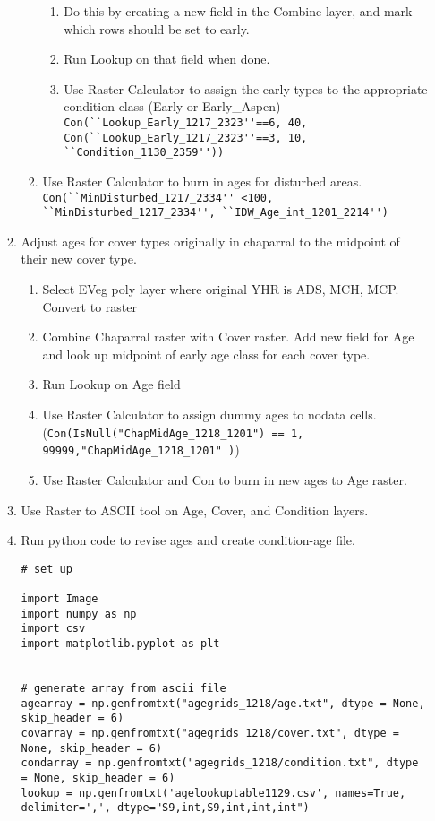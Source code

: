 \begin{enumerate}
\begin{enumerate}
\begin{enumerate}
\begin{enumerate}
                \item Do this by creating a new field in the Combine layer, and mark which rows should be set to early.
                \item Run Lookup on that field when done.
                \item Use Raster Calculator to assign the early types to the appropriate condition class (Early or Early\_Aspen) \lstinline{Con(``Lookup_Early_1217_2323''==6, 40, Con(``Lookup_Early_1217_2323''==3, 10, ``Condition_1130_2359''))}
                \end{enumerate}
            \item Use Raster Calculator to burn in ages for disturbed areas. \lstinline{Con(``MinDisturbed_1217_2334'' <100, ``MinDisturbed_1217_2334'', ``IDW_Age_int_1201_2214'')}
        \end{enumerate}
        \item Adjust ages for cover types originally in chaparral to the midpoint of their new cover type.
        \begin{enumerate}
            \item Select EVeg poly layer where original YHR is ADS, MCH, MCP. Convert to raster
            \item Combine Chaparral raster with Cover raster. Add new field for Age and look up midpoint of early age class for each cover type.
            \item Run Lookup on Age field
            \item Use Raster Calculator to assign dummy ages to nodata cells. (\lstinline{Con(IsNull("ChapMidAge_1218_1201") == 1, 99999,"ChapMidAge_1218_1201" )})
            \item Use Raster Calculator and Con to burn in new ages to Age raster.
        \end{enumerate}
        \item Use Raster to ASCII tool on Age, Cover, and Condition layers.
        \item Run python code to revise ages and create condition-age file.
        \begin{lstlisting}
# set up

import Image
import numpy as np
import csv
import matplotlib.pyplot as plt


# generate array from ascii file
agearray = np.genfromtxt("agegrids_1218/age.txt", dtype = None, skip_header = 6)
covarray = np.genfromtxt("agegrids_1218/cover.txt", dtype = None, skip_header = 6)
condarray = np.genfromtxt("agegrids_1218/condition.txt", dtype = None, skip_header = 6)
lookup = np.genfromtxt('agelookuptable1129.csv', names=True, delimiter=',', dtype="S9,int,S9,int,int,int")


\end{lstlisting}
\end{enumerate}
\end{enumerate}
